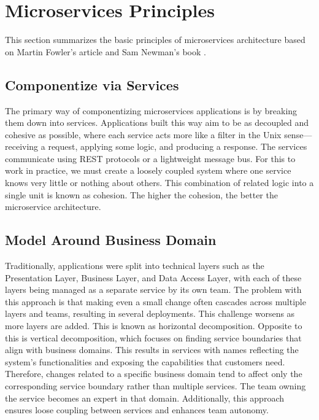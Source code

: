 \section{Microservices Principles}
This section summarizes the basic principles of microservices architecture based on Martin Fowler's article \cite{Fowler} and Sam Newman's book \cite{NewmanBuildingMs}.

\subsection{Componentize via Services}
The primary way of componentizing microservices applications is by breaking them down into services. Applications built this way aim to be as decoupled and cohesive as possible, where each service acts more like a filter in the Unix sense—receiving a request, applying some logic, and producing a response. The services communicate using REST protocols or a lightweight message bus. For this to work in practice, we must create a loosely coupled system where one service knows very little or nothing about others. This combination of related logic into a single unit is known as cohesion. The higher the cohesion, the better the microservice architecture.

\subsection{Model Around Business Domain}
Traditionally, applications were split into technical layers such as the Presentation Layer, Business Layer, and Data Access Layer, with each of these layers being managed as a separate service by its own team. The problem with this approach is that making even a small change often cascades across multiple layers and teams, resulting in several deployments. This challenge worsens as more layers are added. This is known as horizontal decomposition. Opposite to this is vertical decomposition, which focuses on finding service boundaries that align with business domains. This results in services with names reflecting the system’s functionalities and exposing the capabilities that customers need. Therefore, changes related to a specific business domain tend to affect only the corresponding service boundary rather than multiple services. The team owning the service becomes an expert in that domain. Additionally, this approach ensures loose coupling between services and enhances team autonomy.

